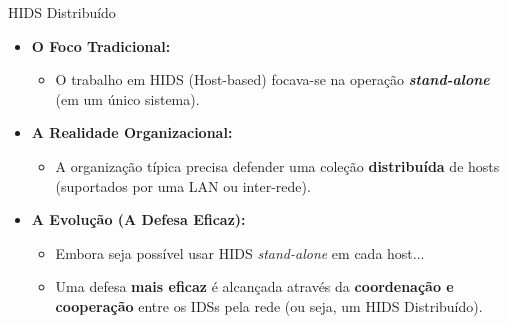 \begin{frame}{HIDS Distribuído}
    \begin{itemize}
        \item \textbf{O Foco Tradicional:}
              \begin{itemize}
                  \item O trabalho em HIDS (Host-based) focava-se na operação \textbf{\textit{stand-alone}} (em um único sistema).
              \end{itemize}

        \item \textbf{A Realidade Organizacional:}
              \begin{itemize}
                  \item A organização típica precisa defender uma coleção \textbf{distribuída} de hosts (suportados por uma LAN ou inter-rede).
              \end{itemize}

        \item \textbf{A Evolução (A Defesa Eficaz):}
              \begin{itemize}
                  \item Embora seja possível usar HIDS \textit{stand-alone} em cada host...
                  \item Uma defesa \textbf{mais eficaz} é alcançada através da \textbf{coordenação e cooperação} entre os IDSs pela rede (ou seja, um HIDS Distribuído).
              \end{itemize}
    \end{itemize}
\end{frame}

